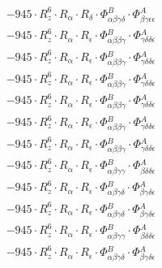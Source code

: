 \documentclass{article}
\begin{document}
\begin{subequations}
\begin{gather}
\begin{array}{c}
 \\[0.2em] 		 - 945 \cdot R_{z}^{6} \cdot R_{\alpha{}} \cdot R_{\delta{}} \cdot \Phi{}^{B}_{\alpha{}\beta{}\gamma{}\delta{}} \cdot \Phi{}^{A}_{\beta{}\gamma{}\epsilon{}\epsilon{}} 
 \\[0.2em] 		 - 945 \cdot R_{z}^{6} \cdot R_{\alpha{}} \cdot R_{\epsilon{}} \cdot \Phi{}^{B}_{\alpha{}\beta{}\beta{}\gamma{}} \cdot \Phi{}^{A}_{\gamma{}\delta{}\delta{}\epsilon{}} 
 \\[0.2em] 		 - 945 \cdot R_{z}^{6} \cdot R_{\alpha{}} \cdot R_{\epsilon{}} \cdot \Phi{}^{B}_{\alpha{}\beta{}\beta{}\gamma{}} \cdot \Phi{}^{A}_{\gamma{}\delta{}\delta{}\epsilon{}} 
 \\[0.2em] 		 - 945 \cdot R_{z}^{6} \cdot R_{\alpha{}} \cdot R_{\epsilon{}} \cdot \Phi{}^{B}_{\alpha{}\beta{}\beta{}\gamma{}} \cdot \Phi{}^{A}_{\gamma{}\delta{}\delta{}\epsilon{}} 
 \\[0.2em] 		 - 945 \cdot R_{z}^{6} \cdot R_{\alpha{}} \cdot R_{\epsilon{}} \cdot \Phi{}^{B}_{\alpha{}\beta{}\beta{}\gamma{}} \cdot \Phi{}^{A}_{\gamma{}\delta{}\delta{}\epsilon{}} 
 \\[0.2em] 		 - 945 \cdot R_{z}^{6} \cdot R_{\alpha{}} \cdot R_{\epsilon{}} \cdot \Phi{}^{B}_{\alpha{}\beta{}\beta{}\gamma{}} \cdot \Phi{}^{A}_{\gamma{}\delta{}\delta{}\epsilon{}} 
 \\[0.2em] 		 - 945 \cdot R_{z}^{6} \cdot R_{\alpha{}} \cdot R_{\epsilon{}} \cdot \Phi{}^{B}_{\alpha{}\beta{}\beta{}\gamma{}} \cdot \Phi{}^{A}_{\gamma{}\delta{}\delta{}\epsilon{}} 
 \\[0.2em] 		 - 945 \cdot R_{z}^{6} \cdot R_{\alpha{}} \cdot R_{\epsilon{}} \cdot \Phi{}^{B}_{\alpha{}\beta{}\gamma{}\gamma{}} \cdot \Phi{}^{A}_{\beta{}\delta{}\delta{}\epsilon{}} 
 \\[0.2em] 		 - 945 \cdot R_{z}^{6} \cdot R_{\alpha{}} \cdot R_{\epsilon{}} \cdot \Phi{}^{B}_{\alpha{}\beta{}\gamma{}\delta{}} \cdot \Phi{}^{A}_{\beta{}\gamma{}\delta{}\epsilon{}} 
 \\[0.2em] 		 - 945 \cdot R_{z}^{6} \cdot R_{\alpha{}} \cdot R_{\epsilon{}} \cdot \Phi{}^{B}_{\alpha{}\beta{}\gamma{}\delta{}} \cdot \Phi{}^{A}_{\beta{}\gamma{}\delta{}\epsilon{}} 
 \\[0.2em] 		 - 945 \cdot R_{z}^{6} \cdot R_{\alpha{}} \cdot R_{\epsilon{}} \cdot \Phi{}^{B}_{\alpha{}\beta{}\gamma{}\gamma{}} \cdot \Phi{}^{A}_{\beta{}\delta{}\delta{}\epsilon{}} 
 \\[0.2em] 		 - 945 \cdot R_{z}^{6} \cdot R_{\alpha{}} \cdot R_{\epsilon{}} \cdot \Phi{}^{B}_{\alpha{}\beta{}\gamma{}\delta{}} \cdot \Phi{}^{A}_{\beta{}\gamma{}\delta{}\epsilon{}} 

\end{array}
\end{gather}
\end{subequations}
\end{document}

